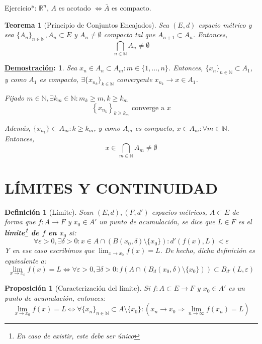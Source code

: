 \documentclass[10pt,a4paper,openright]{book}
\theoremstyle{break}
\newtheorem*{defi}{Definición}
\newtheorem*{theo}{Teorema}
\newtheorem*{prop}{Proposición}
\newtheorem*{demo}{\underline{Demostración}:}
\begin{document}
Ejercicio*:  $\mathbb{R}^n$, $A$ es acotado $\Leftrightarrow \bar{A}$ es compacto.

\begin{theo}[Principio de Conjuntos Encajados]
Sea $(E,d)$ espacio métrico y sea $\{A_n\}_{n \in \mathbb{N}}, A_n \subset E$ y $A_n \neq \emptyset$ compacto tal que $A_{n+1} \subset A_n$. Entonces, $$\bigcap_{n \in \mathbb{N}} A_n \neq \emptyset$$ 
\end{theo}

\begin{demo}
Sea $x_n \in A_n \subset A_m : m \in \{1,\ldots,n\}$. Entonces, $\{x_n\}_{n \in \mathbb{N}} \subset A_1$, y como $A_1$ es compacto, $\exists \{x_{n_k}\}_{k \in \mathbb{N}}$ convergente $x_{n_k} \to x \in A_1$.

Fijado $m \in \mathbb{N}, \exists k_m \in \mathbb{N} : m_k \geq m, k \geq k_m$
$$\left\lbrace x_{n_k} \right\rbrace_{k \geq k_m} \mbox{ converge a } x$$

Además, $\{x_{n_k}\} \subset A_m : k \geq k_m$, y como $A_m$  es compacto, $x \in A_m : \forall m \in \mathbb{N}$. Entonces, $$x \in \bigcap_{m \in \mathbb{N}} A_m \neq \emptyset$$
\end{demo}

\section*{LÍMITES Y CONTINUIDAD}

\begin{defi}[Límite]
Sean $(E,d),(F,d')$ espacios métricos, $A\subset E$ de forma que $f:A \to F$ y $x_0 \in A'$ un punto de acumulación, se dice que $L \in F$ es el \textbf{límite\footnote{En caso de existir, este debe ser único} de $f$ en $x_0$} si:
$$\forall \varepsilon > 0, \exists \delta > 0 : x \in A \cap (B(x_0, \delta) \setminus \{x_0\}) : d'(f(x), L) < \varepsilon$$
Y en ese caso escribimos que $ \displaystyle\lim_{x \to x_0} f(x) = L$. De hecho, dicha definición es equivalente a:
$$\lim_{x \to x_0} f(x) = L \Leftrightarrow \forall \varepsilon > 0, \exists \delta > 0 : f(A \cap (B_d(x_0, \delta) \setminus \{x_0\})) \subset B_{d'}(L, \varepsilon)$$
\end{defi}

\begin{prop}[Caracterización del límite]
Si $f: A \subset E \to F$ y $x_0 \in A'$ es un punto de acumulación, entonces:
$$\lim_{x \to x_0} f(x) = L \Leftrightarrow \forall \{x_n\}_{n \in \mathbb{N}} \subset A \setminus \{x_0\}: \left(x_n \to x_0 \Rightarrow \lim_{n \to \infty} f(x_n) = L\right)$$
\end{prop}
\end{document}
